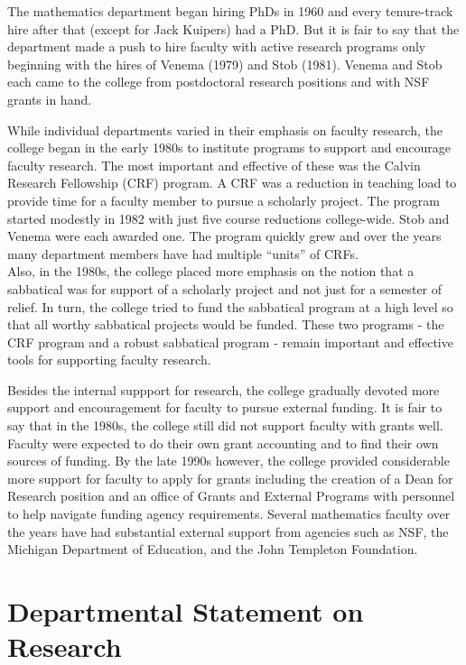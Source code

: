 \documentclass[
]{book}
\begin{document}
The mathematics department began hiring PhDs in 1960 and every tenure-track hire after that (except for Jack Kuipers) had a PhD. But it is fair to say that the department made a push to hire faculty with active research programs only beginning with the hires of Venema (1979) and Stob (1981). Venema and Stob each came to the college from postdoctoral research positions and with NSF grants in hand.

While individual departments varied in their emphasis on faculty research, the college began in the early 1980s to institute programs to support and encourage faculty research. The most important and effective of these was the Calvin Research Fellowship (CRF) program. A CRF was a reduction in teaching load to provide time for a faculty member to pursue a scholarly project. The program started modestly in 1982 with just five course reductions college-wide. Stob and Venema were each awarded one. The program quickly grew and over the years many department members have had multiple ``units'' of CRFs.\\
Also, in the 1980s, the college placed more emphasis on the notion that a sabbatical was for support of a scholarly project and not just for a semester of relief. In turn, the college tried to fund the sabbatical program at a high level so that all worthy sabbatical projects would be funded. These two programs - the CRF program and a robust sabbatical program - remain important and effective tools for supporting faculty research.

Besides the internal suppport for research, the college gradually devoted more support and encouragement for faculty to pursue external funding. It is fair to say that in the 1980s, the college still did not support faculty with grants well. Faculty were expected to do their own grant accounting and to find their own sources of funding. By the late 1990s however, the college provided considerable more support for faculty to apply for grants including the creation of a Dean for Research position and an office of Grants and External Programs with personnel to help navigate funding agency requirements. Several mathematics faculty over the years have had substantial external support from agencies such as NSF, the Michigan Department of Education, and the John Templeton Foundation.

\hypertarget{departmental-statement-on-research}{%
\section{Departmental Statement on Research}\label{departmental-statement-on-research}}
\end{document}
